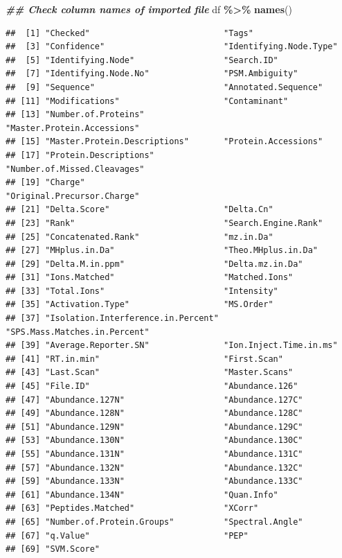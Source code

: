 \documentclass[9pt,a4paper,]{extarticle}
\newenvironment{Shaded}{\begin{snugshade}}{\end{snugshade}}
\newcommand{\DocumentationTok}[1]{\textcolor[rgb]{0.56,0.35,0.01}{\textbf{\textit{#1}}}}
\newcommand{\FunctionTok}[1]{\textcolor[rgb]{0.13,0.29,0.53}{\textbf{#1}}}
\newcommand{\NormalTok}[1]{#1}
\newcommand{\SpecialCharTok}[1]{\textcolor[rgb]{0.81,0.36,0.00}{\textbf{#1}}}
\begin{document}
\begin{Shaded}
\begin{Highlighting}[]
\DocumentationTok{\#\# Check column names of imported file}
\NormalTok{df }\SpecialCharTok{\%\textgreater{}\%}
  \FunctionTok{names}\NormalTok{()}
\end{Highlighting}
\end{Shaded}

\begin{verbatim}
##  [1] "Checked"                           "Tags"                             
##  [3] "Confidence"                        "Identifying.Node.Type"            
##  [5] "Identifying.Node"                  "Search.ID"                        
##  [7] "Identifying.Node.No"               "PSM.Ambiguity"                    
##  [9] "Sequence"                          "Annotated.Sequence"               
## [11] "Modifications"                     "Contaminant"                      
## [13] "Number.of.Proteins"                "Master.Protein.Accessions"        
## [15] "Master.Protein.Descriptions"       "Protein.Accessions"               
## [17] "Protein.Descriptions"              "Number.of.Missed.Cleavages"       
## [19] "Charge"                            "Original.Precursor.Charge"        
## [21] "Delta.Score"                       "Delta.Cn"                         
## [23] "Rank"                              "Search.Engine.Rank"               
## [25] "Concatenated.Rank"                 "mz.in.Da"                         
## [27] "MHplus.in.Da"                      "Theo.MHplus.in.Da"                
## [29] "Delta.M.in.ppm"                    "Delta.mz.in.Da"                   
## [31] "Ions.Matched"                      "Matched.Ions"                     
## [33] "Total.Ions"                        "Intensity"                        
## [35] "Activation.Type"                   "MS.Order"                         
## [37] "Isolation.Interference.in.Percent" "SPS.Mass.Matches.in.Percent"      
## [39] "Average.Reporter.SN"               "Ion.Inject.Time.in.ms"            
## [41] "RT.in.min"                         "First.Scan"                       
## [43] "Last.Scan"                         "Master.Scans"                     
## [45] "File.ID"                           "Abundance.126"                    
## [47] "Abundance.127N"                    "Abundance.127C"                   
## [49] "Abundance.128N"                    "Abundance.128C"                   
## [51] "Abundance.129N"                    "Abundance.129C"                   
## [53] "Abundance.130N"                    "Abundance.130C"                   
## [55] "Abundance.131N"                    "Abundance.131C"                   
## [57] "Abundance.132N"                    "Abundance.132C"                   
## [59] "Abundance.133N"                    "Abundance.133C"                   
## [61] "Abundance.134N"                    "Quan.Info"                        
## [63] "Peptides.Matched"                  "XCorr"                            
## [65] "Number.of.Protein.Groups"          "Spectral.Angle"                   
## [67] "q.Value"                           "PEP"                              
## [69] "SVM.Score"
\end{verbatim}
\end{document}
